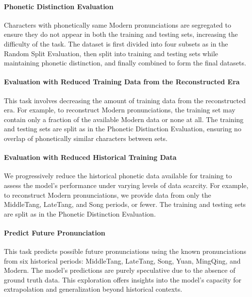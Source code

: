 \paragraph{Phonetic Distinction Evaluation} Characters with phonetically same Modern pronunciations are segregated to ensure they do not appear in both the training and testing sets, increasing the difficulty of the task. The dataset is first divided into four subsets as in the Random Split Evaluation, then split into training and testing sets while maintaining phonetic distinction, and finally combined to form the final datasets.

\paragraph{Evaluation with Reduced Training Data from the Reconstructed Era} This task involves decreasing the amount of training data from the reconstructed era. For example, to reconstruct Modern pronunciations, the training set may contain only a fraction of the available Modern data or none at all. The training and testing sets are split as in the Phonetic Distinction Evaluation, ensuring no overlap of phonetically similar characters between sets.

\paragraph{Evaluation with Reduced Historical Training Data} We progressively reduce the historical phonetic data available for training to assess the model's performance under varying levels of data scarcity. For example, to reconstruct Modern pronunciations, we provide data from only the MiddleTang, LateTang, and Song periods, or fewer. The training and testing sets are split as in the Phonetic Distinction Evaluation.

\paragraph{Predict Future Pronunciation} This task predicts possible future pronunciations using the known pronunciations from six historical periods: MiddleTang, LateTang, Song, Yuan, MingQing, and Modern. The model's predictions are purely speculative due to the absence of ground truth data. This exploration offers insights into the model's capacity for extrapolation and generalization beyond historical contexts.


